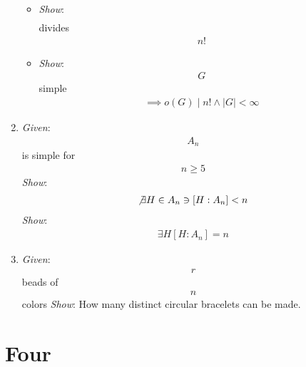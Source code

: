 \begin{enumerate}
  \begin{itemize}
  \tightlist
  \item
    \emph{Show}: \begin{align*}
    [\text{core}(H) : G]\end{align*}
     divides \begin{align*}
    n!\end{align*}
  \item
    \emph{Show}: \begin{align*}
    G\end{align*}
     simple \begin{align*}
    \implies o(G) \mid n! \wedge |G| < \infty\end{align*}
  \end{itemize}
\item
  \emph{Given}: \begin{align*}
  A_n\end{align*}
   is simple for \begin{align*}
  n\geq 5\end{align*}
   \emph{Show}: \begin{align*}
  \not \exists H \in A_n \ni [H : A_n] < n\end{align*}
   \emph{Show}: \begin{align*}
  \exists H [H : A_n] = n\end{align*}
\item
  \emph{Given}: \begin{align*}
  r\end{align*}
   beads of \begin{align*}
  n\end{align*}
   colors \emph{Show}: How many distinct circular bracelets can be made.
\end{enumerate}

\hypertarget{four}{%
\section{Four}\label{four}}

